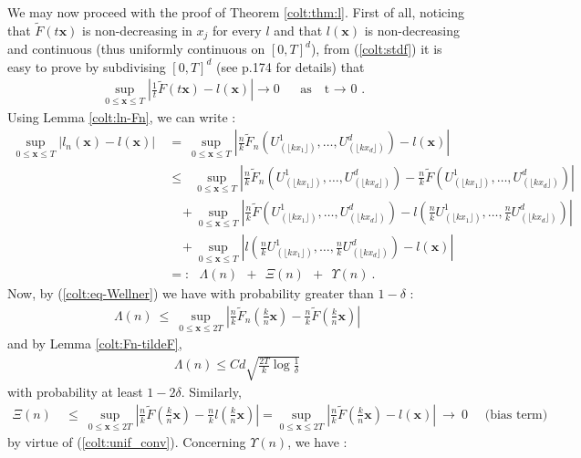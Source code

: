  We may now proceed with the proof of Theorem \ref{colt:thm:l}.
First of all, noticing that $\tilde F(t\mathbf{x})$ is non-decreasing in $x_j$ for every $l$ and that $l(\mathbf{x})$ is non-decreasing and continuous (thus uniformly continuous on $[0,T]^d$), from (\ref{colt:stdf}) it is easy to prove by subdivising $[0,T]^d$ (see \cite{Qi97} p.174 for details) that 
\begin{align}
\label{colt:unif_conv}
\sup_{0 \le \mathbf{x} \le T}\left| \frac{1}{t} \tilde F ( t \mathbf{x})-l(\mathbf{x}) \right|  \to 0 \text{~~~ as~~ t $\to$ 0 . }
\end{align}
\noindent
Using Lemma \ref{colt:ln-Fn}, we can write :
\begin{align*}
\sup_{0 \le \mathbf{x} \le T} \left| l_n(\mathbf{x}) - l(\mathbf{x}) \right| &~=~ \sup_{0 \le \mathbf{x} \le T} \left| \frac{n}{k} \tilde F_n \left( U_{(\lfloor kx_1\rfloor )}^1,\ldots, U_{(\lfloor kx_d\rfloor )}^d \right) - l(\mathbf{x}) \right| \\
& ~\le~~~ \sup_{0 \le \mathbf{x} \le T} \left| \frac{n}{k} \tilde F_n \left(U_{(\lfloor kx_1\rfloor )}^1,\ldots, U_{(\lfloor kx_d\rfloor )}^d \right) - \frac{n}{k} \tilde F \left(U_{(\lfloor kx_1\rfloor )}^1,\ldots, U_{(\lfloor kx_d\rfloor )}^d \right)  \right| 
\\&~~~~~ + \sup_{0 \le \mathbf{x} \le T} \left| \frac{n}{k} \tilde F \left(U_{(\lfloor kx_1\rfloor )}^1,\ldots, U_{(\lfloor kx_d\rfloor )}^d \right) - l \left(\frac{n}{k} U_{(\lfloor kx_1\rfloor )}^1,\ldots, \frac{n}{k} U_{(\lfloor kx_d\rfloor )}^d \right) \right|
\\&~~~~~ + \sup_{0 \le \mathbf{x} \le T} \left| l \left(\frac{n}{k} U_{(\lfloor kx_1\rfloor )}^1, \ldots,\frac{n}{k} U_{(\lfloor kx_d\rfloor )}^d \right) - l(\mathbf{x}) \right|
\\&~=:~~~ \Lambda(n) ~~+~~ \Xi(n) ~~+~~ \Upsilon(n)~.
\end{align*}
\noindent
Now, by (\ref{colt:eq-Wellner}) we have with probability greater than $1-\delta$ :
\begin{align*} 
\Lambda(n) ~\le~ \sup_{0 \le \mathbf{x} \le 2T}\left|\frac{n}{k} \tilde F_n(\frac{k}{n}\mathbf{x})-\frac{n}{k} \tilde F ( \frac{k}{n} \mathbf{x})\right|
\end{align*}
\noindent
and by Lemma \ref{colt:Fn-tildeF}, 
\begin{align*}
 \Lambda(n) \le Cd \sqrt{\frac{2 T}{k}\log\frac{1}{\delta}}   
\end{align*}
\noindent
with probability at least $1-2\delta$. Similarly,
\begin{align*} 
\Xi(n) &~\le~  \sup_{0 \le \mathbf{x} \le  2 T}\left|\frac{n}{k}
  \tilde F(\frac{k}{n}\mathbf{x})-\frac{n}{k} l ( \frac{k}{n}
  \mathbf{x})\right| = 
 \sup_{0 \le \mathbf{x} \le  2 T} \left|\frac{n}{k}
  \tilde F(\frac{k}{n}\mathbf{x})- l (
  \mathbf{x})\right| ~\to~0 \quad\text{ (bias term)} 
\end{align*}
by virtue of (\ref{colt:unif_conv}). Concerning $\Upsilon(n)$, we have :


